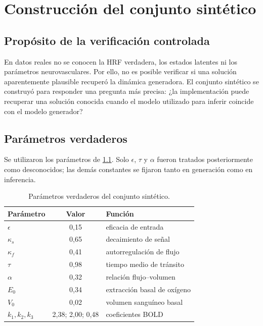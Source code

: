 \chapter{Construcción del conjunto sintético}

\section{Propósito de la verificación controlada}
En datos reales no se conocen la HRF verdadera, los estados latentes ni los parámetros neurovasculares. Por ello, no es posible verificar si una solución aparentemente plausible recuperó la dinámica generadora. El conjunto sintético se construyó para responder una pregunta más precisa: ¿la implementación puede recuperar una solución conocida cuando el modelo utilizado para inferir coincide con el modelo generador?


\section{Parámetros verdaderos}
Se utilizaron los parámetros de \cref{tab:true_params}. Solo $\epsilon$, $\tau$ y $\alpha$ fueron tratados posteriormente como desconocidos; las demás constantes se fijaron tanto en generación como en inferencia.

\begin{table}[H]
\centering
\caption{Parámetros verdaderos del conjunto sintético.}
\label{tab:true_params}
\begin{tabular}{lcl}
\toprule
\textbf{Parámetro} & \textbf{Valor} & \textbf{Función} \\
\midrule
$\epsilon$ & 0,15 & eficacia de entrada \\
$\kappa_s$ & 0,65 & decaimiento de señal \\
$\kappa_f$ & 0,41 & autorregulación de flujo \\
$\tau$ & 0,98 & tiempo medio de tránsito \\
$\alpha$ & 0,32 & relación flujo--volumen \\
$E_0$ & 0,34 & extracción basal de oxígeno \\
$V_0$ & 0,02 & volumen sanguíneo basal \\
$k_1,k_2,k_3$ & 2,38; 2,00; 0,48 & coeficientes BOLD \\
\bottomrule
\end{tabular}
\end{table}

